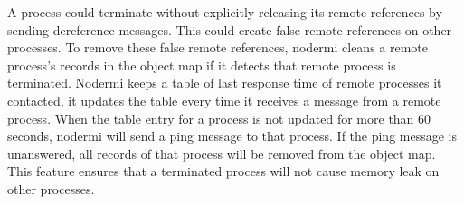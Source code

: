A process could terminate without explicitly releasing its remote references
by sending dereference messages.
This could create false remote references on other processes.
To remove these false remote references,
nodermi cleans a remote process's records in the object map if
it detects that remote process is terminated.
Nodermi keeps a table of last response time of remote processes it contacted,
it updates the table every time it receives a message from a remote process.
When the table entry for a process is not updated for more than 60 seconds, nodermi
will send a ping message to that process.
If the ping message is unanswered, all records of that process will be removed
from the object map.
This feature ensures that a terminated process will not cause memory leak on
other processes.








